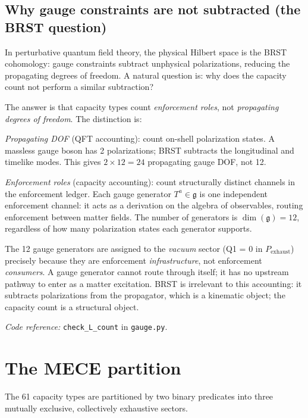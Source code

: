 \documentclass[11pt,a4paper]{article}
\theoremstyle{definition}
\newcommand{\coderef}[2]{\smallskip\noindent\textit{Code reference:} \texttt{#1} in \texttt{#2}.}
\begin{document}
\subsection{Why gauge constraints are not subtracted (the BRST question)}
\label{sec:BRST}

In perturbative quantum field theory, the physical Hilbert space is the
BRST cohomology: gauge constraints subtract unphysical polarizations,
reducing the propagating degrees of freedom.  A natural question is: why
does the capacity count not perform a similar subtraction?

The answer is that capacity types count \emph{enforcement roles}, not
\emph{propagating degrees of freedom}.  The distinction is:

\smallskip\noindent\textit{Propagating DOF} (QFT accounting): count
on-shell polarization states.  A massless gauge boson has 2 polarizations;
BRST subtracts the longitudinal and timelike modes.  This gives
$2 \times 12 = 24$ propagating gauge DOF, not 12.

\smallskip\noindent\textit{Enforcement roles} (capacity accounting):
count structurally distinct channels in the enforcement ledger.  Each
gauge generator $T^a \in \mathfrak{g}$ is one independent enforcement
channel: it acts as a derivation on the algebra of observables, routing
enforcement between matter fields.  The number of generators is
$\dim(\mathfrak{g}) = 12$, regardless of how many polarization states
each generator supports.

The 12 gauge generators are assigned to the \emph{vacuum} sector
(Q1 = 0 in $P_{\mathrm{exhaust}}$) precisely because they are
enforcement \emph{infrastructure}, not enforcement \emph{consumers}.
A gauge generator cannot route through itself; it has no upstream
pathway to enter as a matter excitation.  BRST is irrelevant to this
accounting: it subtracts polarizations from the propagator, which is a
kinematic object; the capacity count is a structural object.

\coderef{check\_L\_count}{gauge.py}


\section{The MECE partition}
\label{sec:mece}


The 61 capacity types are partitioned by two binary predicates into
three mutually exclusive, collectively exhaustive sectors.
\end{document}
